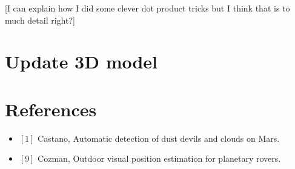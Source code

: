 \documentclass[10pt]{article}
\begin{document}
[I can explain how I did some clever dot product tricks but I think that is to much detail right?]


\section{Update 3D model}


\section{References}
\begin{itemize}
\item $[1]$ Castano, Automatic detection of dust devils and clouds on Mars.
\item $[9]$ Cozman, Outdoor visual position estimation for planetary rovers.
\end{itemize}
\end{document}
